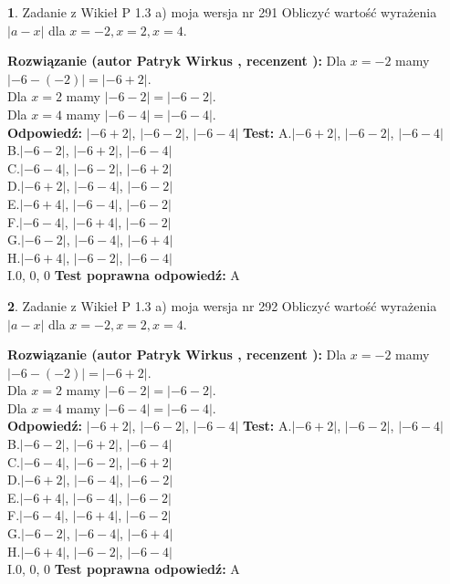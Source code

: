 \documentclass[12pt, a4paper]{article}
\theoremstyle{definition} %
\newtheorem{zad}{}
\newcommand{\zadStart}[1]{\begin{zad}#1\newline}
\newcommand{\zadStop}{\end{zad}}
\newcommand{\rozwStart}[2]{\noindent \textbf{Rozwiązanie (autor #1 , recenzent #2): }\newline}
\newcommand{\rozwStop}{\newline}
\newcommand{\odpStart}{\noindent \textbf{Odpowiedź:}\newline}
\newcommand{\odpStop}{\newline}
\newcommand{\testStart}{\noindent \textbf{Test:}\newline}
\newcommand{\testStop}{\newline}
\newcommand{\kluczStart}{\noindent \textbf{Test poprawna odpowiedź:}\newline}
\newcommand{\kluczStop}{\newline}
\begin{document}
\zadStart{Zadanie z Wikieł P 1.3 a) moja wersja nr 291}
Obliczyć wartość wyrażenia $|a - x|$ dla $x=-2,x=2,x=4$.
\zadStop
\rozwStart{Patryk Wirkus}{}
Dla $x = -2$ mamy $|-6 - (-2)| = |-6 + 2|$.\\
Dla $x = 2$ mamy $|-6 - 2| = |-6 - 2|$.\\
Dla $x = 4$ mamy $|-6 - 4| = |-6 - 4|$.\\
\rozwStop
\odpStart
$|-6 + 2|$, $|-6 - 2|$, $|-6 - 4|$
\odpStop
\testStart
A.$|-6 + 2|$, $|-6 - 2|$, $|-6 - 4|$\\
B.$|-6 - 2|$, $|-6 + 2|$, $|-6 - 4|$\\
C.$|-6 - 4|$, $|-6 - 2|$, $|-6 + 2|$\\
D.$|-6 + 2|$, $|-6 - 4|$, $|-6 - 2|$\\
E.$|-6 + 4|$, $|-6 - 4|$, $|-6 - 2|$\\
F.$|-6 - 4|$, $|-6 + 4|$, $|-6 - 2|$\\
G.$|-6 - 2|$, $|-6 - 4|$, $|-6 + 4|$\\
H.$|-6 + 4|$, $|-6 - 2|$, $|-6 - 4|$\\
I.$0$, $0$, $0$
\testStop
\kluczStart
A
\kluczStop



\zadStart{Zadanie z Wikieł P 1.3 a) moja wersja nr 292}
Obliczyć wartość wyrażenia $|a - x|$ dla $x=-2,x=2,x=4$.
\zadStop
\rozwStart{Patryk Wirkus}{}
Dla $x = -2$ mamy $|-6 - (-2)| = |-6 + 2|$.\\
Dla $x = 2$ mamy $|-6 - 2| = |-6 - 2|$.\\
Dla $x = 4$ mamy $|-6 - 4| = |-6 - 4|$.\\
\rozwStop
\odpStart
$|-6 + 2|$, $|-6 - 2|$, $|-6 - 4|$
\odpStop
\testStart
A.$|-6 + 2|$, $|-6 - 2|$, $|-6 - 4|$\\
B.$|-6 - 2|$, $|-6 + 2|$, $|-6 - 4|$\\
C.$|-6 - 4|$, $|-6 - 2|$, $|-6 + 2|$\\
D.$|-6 + 2|$, $|-6 - 4|$, $|-6 - 2|$\\
E.$|-6 + 4|$, $|-6 - 4|$, $|-6 - 2|$\\
F.$|-6 - 4|$, $|-6 + 4|$, $|-6 - 2|$\\
G.$|-6 - 2|$, $|-6 - 4|$, $|-6 + 4|$\\
H.$|-6 + 4|$, $|-6 - 2|$, $|-6 - 4|$\\
I.$0$, $0$, $0$
\testStop
\kluczStart
A
\kluczStop
\end{document}
